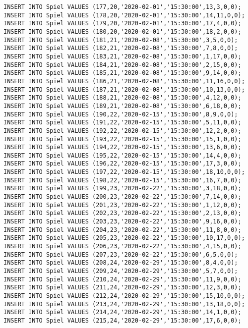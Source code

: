 \documentclass{bschlangaul-aufgabe}
\begin{document}
\begin{verbatim}
INSERT INTO Spiel VALUES (177,20,'2020-02-01','15:30:00',13,3,0,0);
INSERT INTO Spiel VALUES (178,20,'2020-02-01','15:30:00',14,11,0,0);
INSERT INTO Spiel VALUES (179,20,'2020-02-01','15:30:00',17,4,0,0);
INSERT INTO Spiel VALUES (180,20,'2020-02-01','15:30:00',18,2,0,0);
INSERT INTO Spiel VALUES (181,21,'2020-02-08','15:30:00',3,5,0,0);
INSERT INTO Spiel VALUES (182,21,'2020-02-08','15:30:00',7,8,0,0);
INSERT INTO Spiel VALUES (183,21,'2020-02-08','15:30:00',1,17,0,0);
INSERT INTO Spiel VALUES (184,21,'2020-02-08','15:30:00',2,15,0,0);
INSERT INTO Spiel VALUES (185,21,'2020-02-08','15:30:00',9,14,0,0);
INSERT INTO Spiel VALUES (186,21,'2020-02-08','15:30:00',11,16,0,0);
INSERT INTO Spiel VALUES (187,21,'2020-02-08','15:30:00',10,13,0,0);
INSERT INTO Spiel VALUES (188,21,'2020-02-08','15:30:00',4,12,0,0);
INSERT INTO Spiel VALUES (189,21,'2020-02-08','15:30:00',6,18,0,0);
INSERT INTO Spiel VALUES (190,22,'2020-02-15','15:30:00',8,9,0,0);
INSERT INTO Spiel VALUES (191,22,'2020-02-15','15:30:00',5,11,0,0);
INSERT INTO Spiel VALUES (192,22,'2020-02-15','15:30:00',12,2,0,0);
INSERT INTO Spiel VALUES (193,22,'2020-02-15','15:30:00',15,1,0,0);
INSERT INTO Spiel VALUES (194,22,'2020-02-15','15:30:00',13,6,0,0);
INSERT INTO Spiel VALUES (195,22,'2020-02-15','15:30:00',14,4,0,0);
INSERT INTO Spiel VALUES (196,22,'2020-02-15','15:30:00',17,3,0,0);
INSERT INTO Spiel VALUES (197,22,'2020-02-15','15:30:00',18,10,0,0);
INSERT INTO Spiel VALUES (198,22,'2020-02-15','15:30:00',16,7,0,0);
INSERT INTO Spiel VALUES (199,23,'2020-02-22','15:30:00',3,18,0,0);
INSERT INTO Spiel VALUES (200,23,'2020-02-22','15:30:00',7,14,0,0);
INSERT INTO Spiel VALUES (201,23,'2020-02-22','15:30:00',1,12,0,0);
INSERT INTO Spiel VALUES (202,23,'2020-02-22','15:30:00',2,13,0,0);
INSERT INTO Spiel VALUES (203,23,'2020-02-22','15:30:00',9,16,0,0);
INSERT INTO Spiel VALUES (204,23,'2020-02-22','15:30:00',11,8,0,0);
INSERT INTO Spiel VALUES (205,23,'2020-02-22','15:30:00',10,17,0,0);
INSERT INTO Spiel VALUES (206,23,'2020-02-22','15:30:00',4,15,0,0);
INSERT INTO Spiel VALUES (207,23,'2020-02-22','15:30:00',6,5,0,0);
INSERT INTO Spiel VALUES (208,24,'2020-02-29','15:30:00',8,4,0,0);
INSERT INTO Spiel VALUES (209,24,'2020-02-29','15:30:00',5,7,0,0);
INSERT INTO Spiel VALUES (210,24,'2020-02-29','15:30:00',11,9,0,0);
INSERT INTO Spiel VALUES (211,24,'2020-02-29','15:30:00',12,3,0,0);
INSERT INTO Spiel VALUES (212,24,'2020-02-29','15:30:00',15,10,0,0);
INSERT INTO Spiel VALUES (213,24,'2020-02-29','15:30:00',13,18,0,0);
INSERT INTO Spiel VALUES (214,24,'2020-02-29','15:30:00',14,1,0,0);
INSERT INTO Spiel VALUES (215,24,'2020-02-29','15:30:00',17,6,0,0);

\end{verbatim}
\end{document}
